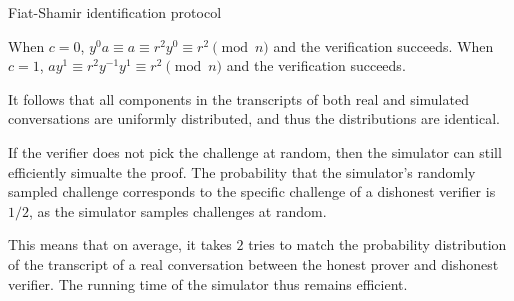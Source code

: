 \documentclass{practice}
\begin{document}
\begin{task}{Fiat-Shamir identification protocol}
\begin{enumerate}
    When $c = 0$, $y^0a \equiv a \equiv r^2 y^{0} \equiv r^2 \pmod{n}$ and the verification succeeds.
    When $c = 1$, $ay^1 \equiv r^2y^{-1}y^1 \equiv r^2 \pmod{n}$ and the verification succeeds.

    It follows that all components in the transcripts of both real and simulated conversations are uniformly distributed, and thus the distributions are identical.

    If the verifier does not pick the challenge at random, then the simulator can still efficiently simualte the proof.
    The probability that the simulator's randomly sampled challenge corresponds to the specific challenge of a dishonest verifier is $1/2$, as the simulator samples challenges at random.

    This means that on average, it takes $2$ tries to match the probability distribution of the transcript of a real conversation between the honest prover and dishonest verifier.
    The running time of the simulator thus remains efficient.
  \end{enumerate}
\end{task}
\end{document}
